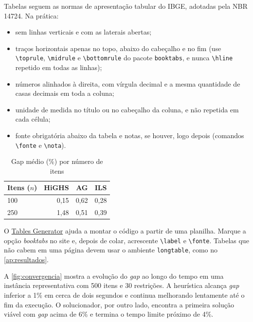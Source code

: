 \begin{instrucao}
Tabelas seguem as normas de apresentação tabular do IBGE, adotadas pela NBR
14724. Na prática:
\begin{itemize}
  \item sem linhas verticais e com as laterais abertas;
  \item traços horizontais apenas no topo, abaixo do cabeçalho e no fim (use
        \verb|\toprule|, \verb|\midrule| e \verb|\bottomrule| do pacote
        \verb|booktabs|, e nunca \verb|\hline| repetido em todas as linhas);
  \item números alinhados à direita, com vírgula decimal e a mesma quantidade
        de casas decimais em toda a coluna;
  \item unidade de medida no título ou no cabeçalho da coluna, e não repetida
        em cada célula;
  \item fonte obrigatória abaixo da tabela e notas, se houver, logo depois
        (comandos \verb|\fonte| e \verb|\nota|).
\end{itemize}
\begin{exemplocodigo}
\begin{table}[htbp]
  \centering
  \caption{Gap médio (\%) por número de itens}
  \label{tab:resultados}
  \small
  \begin{tabular}{@{}lrrr@{}}
    \toprule
    Itens ($n$) & HiGHS & AG    & ILS  \\
    \midrule
    100         & 0,15  & 0,62  & 0,28 \\
    250         & 1,48  & 0,51  & 0,39 \\
    \bottomrule
  \end{tabular}
  \fonteautor
\end{table}
\end{exemplocodigo}
O \href{https://www.tablesgenerator.com/}{Tables Generator} ajuda a montar o
código a partir de uma planilha. Marque a opção \emph{booktabs} no site e,
depois de colar, acrescente \verb|\label| e \verb|\fonte|. Tabelas que não
cabem em uma página devem usar o ambiente \verb|longtable|, como no
\cref{ap:resultados}.
\end{instrucao}

A \cref{fig:convergencia} mostra a evolução do \emph{gap} ao longo do tempo em
uma instância representativa com 500 itens e 30 restrições. A heurística
alcança \emph{gap} inferior a 1\% em cerca de dois segundos e continua
melhorando lentamente até o fim da execução. O solucionador, por outro lado,
encontra a primeira solução viável com \emph{gap} acima de 6\% e termina o
tempo limite próximo de 4\%.

